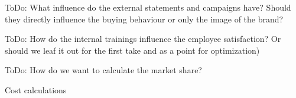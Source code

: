ToDo: What influence do the external statements and campaigns have? Should they directly influence the buying behaviour or only the image of the brand? 

ToDo: How do the internal trainings influence the employee satisfaction? Or should we leaf it out for the first take and as a point for optimization) 

ToDo: How do we want to calculate the market share? 

Cost calculations 